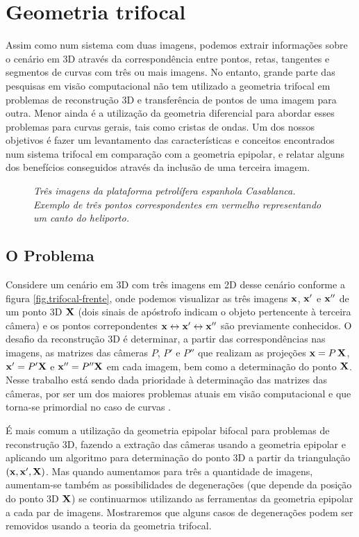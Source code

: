 \newpage
\section{Geometria trifocal}\label{sec.geo-tri}
Assim como num sistema com duas imagens, podemos extrair informações sobre o cenário em 3D através da correspondência entre pontos, retas, tangentes e segmentos de curvas com três  ou mais imagens. No entanto, grande parte das pesquisas em visão computacional não tem utilizado a geometria trifocal em problemas de reconstrução 3D e transferência de pontos de uma imagem para outra. Menor ainda é a utilização da geometria diferencial para abordar esses problemas para curvas gerais, tais como cristas de ondas. Um dos nossos objetivos é fazer um levantamento das características e conceitos encontrados num sistema trifocal em comparação com a geometria epipolar, e relatar alguns dos benefícios conseguidos através da inclusão de uma terceira imagem.

\begin{figure}[htb!]
\centering
{}
\quad
{}
\quad
{}
\caption{{\it Três imagens da plataforma petrolífera espanhola Casablanca. Exemplo de três pontos correspondentes em vermelho representando um canto do heliporto.}}
\end{figure}

\subsection{O Problema}
Considere um cenário em 3D com três imagens em 2D desse cenário conforme a figura \ref{fig.trifocal-frente}, onde podemos visualizar as três imagens $\mathbf{x}$, $\mathbf{x}'$ e $\mathbf{x}''$ de um ponto 3D $\mathbf{X}$ (dois sinais de apóstrofo indicam o objeto pertencente à terceira câmera) e os pontos correpondentes $\mathbf{x}\leftrightarrow\mathbf{x}'\leftrightarrow\mathbf{x}''$ são previamente conhecidos. O desafio da reconstrução 3D é determinar, a partir das correspondências nas imagens, as matrizes das câmeras $P$, $P'$ e $P''$ que realizam as projeções $\mathbf{x}=P\,\mathbf{X}$, $\mathbf{x}'=P'\mathbf{X}$ e $\mathbf{x}''=P''\mathbf{X}$ em cada imagem, bem como a determinação do ponto $\mathbf{X}$. Nesse trabalho está sendo dada prioridade à determinação das matrizes das câmeras, por ser um dos maiores problemas atuais em visão computacional e que torna-se primordial no caso de curvas \citep{tese-fabbri}.

É mais comum a utilização da geometria epipolar bifocal para problemas de reconstrução 3D, fazendo a extração das câmeras usando a geometria epipolar e aplicando um algoritmo para determinação do ponto 3D a partir da triangulação $(\mathbf{x},\mathbf{x}',\mathbf{X})$. Mas quando aumentamos para três a quantidade de imagens, aumentam-se também as possibilidades de degenerações (que depende  da posição do ponto 3D $\mathbf{X}$) se continuarmos utilizando as ferramentas da geometria epipolar a cada par de imagens. Mostraremos que alguns casos de degenerações podem ser removidos usando a teoria da geometria trifocal.


